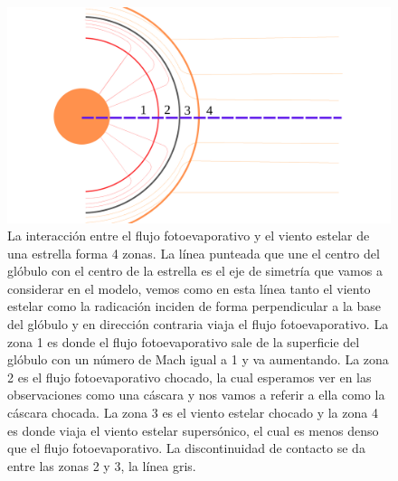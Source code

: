 \documentclass{book}
\begin{document}
\begin{figure}[htb]
    \centering    \includegraphics[width=\textwidth]{Nuevas imagenes finales/C2_zone_new_01.pdf}
    \caption{La interacción entre el flujo fotoevaporativo y el viento estelar de una estrella forma 4 zonas. La línea punteada que une el centro del  glóbulo con el centro de la estrella es el eje de simetría que vamos a considerar en el modelo, vemos como en esta línea tanto el viento estelar como la radicación inciden de forma perpendicular a la base del glóbulo y en dirección contraria viaja el flujo fotoevaporativo. La zona 1 es donde el flujo fotoevaporativo sale de la superficie del glóbulo con un número de Mach igual a 1 y va aumentando. La zona 2 es el flujo fotoevaporativo chocado, la cual esperamos ver en las observaciones como una cáscara y nos vamos a referir a ella como la cáscara chocada. La zona 3 es el viento estelar chocado y la zona 4 es donde viaja el viento estelar supersónico, el cual es menos denso que el flujo fotoevaporativo. La discontinuidad de contacto se da entre las zonas 2 y 3, la línea gris.}
    \label{fig:zones}
\end{figure}
\end{document}
